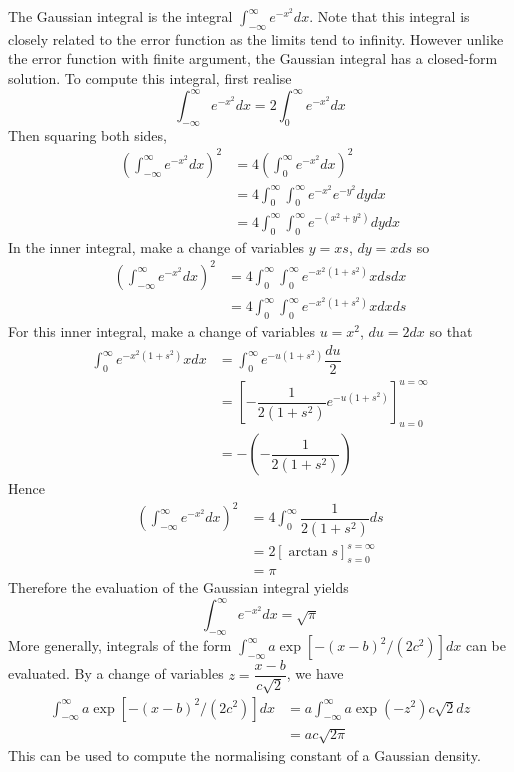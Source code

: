 \documentclass[11pt]{report} %
\begin{document}
The Gaussian integral is the integral $\int_{-\infty}^{\infty}e^{-x^{2}}dx$. Note that this integral is closely related to the error function as the limits tend to infinity. However unlike the error function with finite argument, the Gaussian integral has a closed-form solution. To compute this integral, first realise
\begin{equation}
\int_{-\infty}^{\infty}e^{-x^{2}}dx = 2\int_{0}^{\infty}e^{-x^{2}}dx
\end{equation}
Then squaring both sides,
\begin{align}
\left(\int_{-\infty}^{\infty}e^{-x^{2}}dx\right)^{2} &= 4\left(\int_{0}^{\infty}e^{-x^{2}}dx\right)^{2} \\
&= 4\int_{0}^{\infty}\int_{0}^{\infty}e^{-x^{2}}e^{-y^{2}}dydx \\
&= 4\int_{0}^{\infty}\int_{0}^{\infty}e^{-\left(x^{2} + y^{2}\right)}dydx
\end{align}
In the inner integral, make a change of variables $y = xs$, $dy = x ds$ so
\begin{align}
\left(\int_{-\infty}^{\infty}e^{-x^{2}}dx\right)^{2} &= 4\int_{0}^{\infty}\int_{0}^{\infty}e^{-x^{2}\left(1 + s^{2}\right)}xdsdx \\
&= 4\int_{0}^{\infty}\int_{0}^{\infty}e^{-x^{2}\left(1 + s^{2}\right)}xdxds
\end{align}
For this inner integral, make a change of variables $u = x^{2}$, $du = 2dx$ so that
\begin{align}
\int_{0}^{\infty}e^{-x^{2}\left(1 + s^{2}\right)}xdx &= \int_{0}^{\infty}e^{-u\left(1 + s^{2}\right)}\dfrac{du}{2} \\
&= \left[-\dfrac{1}{2\left(1 + s^{2}\right)}e^{-u\left(1 + s^{2}\right)}\right]_{u = 0}^{u = 
\infty} \\
&= -\left(-\dfrac{1}{2\left(1 + s^{2}\right)}\right)
\end{align}
Hence
\begin{align}
\left(\int_{-\infty}^{\infty}e^{-x^{2}}dx\right)^{2} &= 4\int_{0}^{\infty}\dfrac{1}{2\left(1 + s^{2}\right)}ds \\
&= 2\left[\arctan s\right]_{s = 0}^{s = \infty} \\
&= \pi
\end{align}
Therefore the evaluation of the Gaussian integral yields
\begin{equation}
\int_{-\infty}^{\infty}e^{-x^{2}}dx = \sqrt{\pi}
\end{equation}
More generally, integrals of the form $\int_{-\infty}^{\infty}a\exp\left[-\left(x - b\right)^{2}/\left(2c^{2}\right)\right]dx$ can be evaluated. By a change of variables $z = \dfrac{x - b}{c\sqrt{2}}$, we have
\begin{align}
\int_{-\infty}^{\infty}a\exp\left[-\left(x - b\right)^{2}/\left(2c^{2}\right)\right]dx &= a\int_{-\infty}^{\infty}a\exp\left(-z^{2}\right)c\sqrt{2}dz \\
&= ac\sqrt{2\pi}
\end{align}
This can be used to compute the normalising constant of a Gaussian density.
\end{document}
